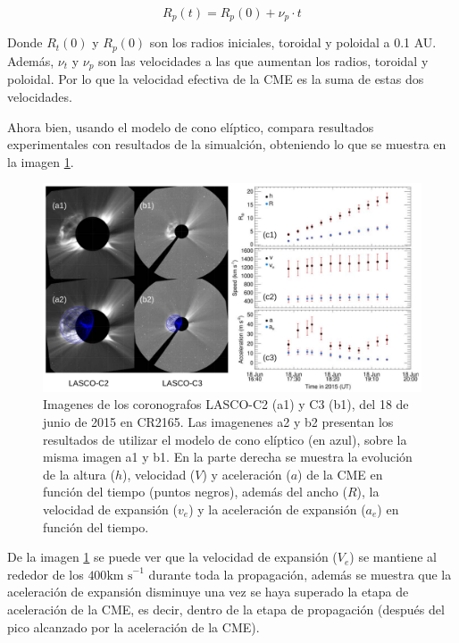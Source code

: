 \begin{equation}
R_{p}(t)=R_{p}(0)+\nu_{p}\cdot t
\end{equation}

Donde $R_t(0)$ y $R_p(0)$ son los radios iniciales, toroidal y poloidal a 0.1 AU. Además, $\nu_t$ y $\nu_p$ son las velocidades a las que aumentan los radios, toroidal y poloidal. Por lo que la velocidad efectiva de la \ac{CME} es la suma de estas dos velocidades.

Ahora bien, usando el modelo de cono elíptico, \cite{mayank-2023} compara resultados experimentales con resultados de la simualción, obteniendo lo que se muestra en la imagen \ref{fig:SWASTi-CME compa}.

\begin{figure}[H]
\centering
    \includegraphics[width=1\linewidth]{imag/SWASTI_CME.png}
    \caption[Resultados del modelo usado en \cite{mayank-2023} sobre la cinemática de la CME, comparado con datos experimentales]{Imagenes de los coronografos LASCO-C2 (a1) y C3 (b1), del 18 de junio de 2015 en CR2165. Las imagenenes a2 y b2 presentan los resultados de utilizar el modelo de cono elíptico (en azul), sobre la misma imagen a1 y b1. En la parte derecha se muestra la evolución de la altura ($h$), velocidad ($V$) y aceleración ($a$) de la \ac{CME} en función del tiempo (puntos negros), además del ancho ($R$), la velocidad de expansión ($v_e$) y la aceleración de expansión ($a_e$) en función del tiempo.}
    \label{fig:SWASTi-CME compa}
\end{figure}
De la imagen \ref{fig:SWASTi-CME compa} se puede ver que la velocidad de expansión ($V_e$) se mantiene al rededor de los $400 \text{km s}^{-1}$ durante toda la propagación, además se muestra que la aceleración de expansión disminuye una vez se haya superado la etapa de aceleración de la CME, es decir, dentro de la etapa de propagación (después del pico alcanzado por la aceleración de la CME).
